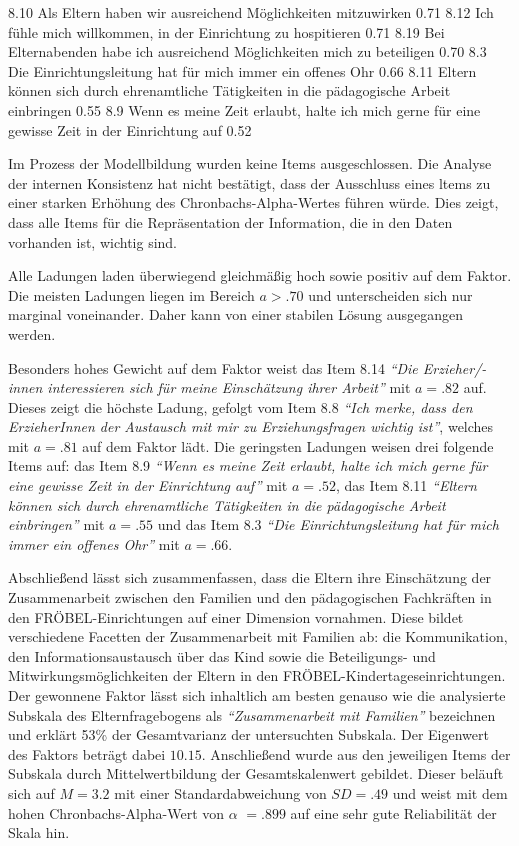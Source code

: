 \documentclass[12pt,a4paper]{article}
\begin{document}
8.10 Als Eltern haben wir ausreichend Möglichkeiten mitzuwirken              0.71
8.12 Ich fühle mich willkommen, in der Einrichtung zu hospitieren              0.71
8.19 Bei Elternabenden habe ich ausreichend Möglichkeiten
        mich zu beteiligen                                                                                   0.70
8.3 Die Einrichtungsleitung hat für mich immer ein offenes Ohr                   0.66         
8.11 Eltern können sich durch ehrenamtliche Tätigkeiten in die
        pädagogische Arbeit einbringen                                                              0.55
8.9 Wenn es meine Zeit erlaubt, halte ich mich gerne für eine
      gewisse Zeit in der Einrichtung auf                                                          0.52

Im Prozess der Modellbildung wurden keine Items ausgeschlossen. Die Analyse der internen Konsistenz hat nicht bestätigt, dass der Ausschluss eines ltems zu einer starken Erhöhung des Chronbachs-Alpha-Wertes führen würde. Dies zeigt, dass alle Items für die Repräsentation der Information, die in den Daten vorhanden ist, wichtig sind.

	Alle Ladungen laden überwiegend gleichmäßig hoch sowie positiv auf dem Faktor. Die meisten Ladungen liegen im Bereich $a >.70$ und unterscheiden sich nur marginal voneinander. Daher kann von einer stabilen Lösung ausgegangen werden.
	
	Besonders hohes Gewicht auf dem Faktor weist das Item 8.14 \textit{"`Die Erzieher/-innen interessieren sich für meine Einschätzung ihrer Arbeit"'} mit $a= .82$ auf. Dieses zeigt die höchste Ladung, gefolgt vom Item 8.8 \textit{"`Ich merke, dass den ErzieherInnen der Austausch mit mir zu Erziehungsfragen wichtig ist"'}, welches mit $a = .81$ auf dem Faktor lädt.
	Die geringsten Ladungen weisen drei folgende Items auf: das Item 8.9 \textit{"`Wenn es meine Zeit erlaubt, halte ich mich gerne für eine gewisse Zeit in der Einrichtung auf"'} mit $a = .52$, das Item 8.11 \textit{"`Eltern können sich durch ehrenamtliche Tätigkeiten in die pädagogische Arbeit einbringen"'} mit $a = .55$ und das Item 8.3 \textit{"`Die Einrichtungsleitung hat für mich immer ein offenes Ohr"'} mit $a = .66$.   
	
	Abschließend lässt sich zusammenfassen, dass die Eltern ihre Einschätzung der Zusammenarbeit zwischen den Familien und den pädagogischen Fachkräften in den FRÖBEL-Einrichtungen auf einer Dimension vornahmen. Diese bildet verschiedene Facetten der Zusammenarbeit mit Familien ab: die Kommunikation, den Informationsaustausch über das Kind sowie die Beteiligungs- und Mitwirkungsmöglichkeiten der Eltern in den FRÖBEL-Kindertageseinrichtungen. Der gewonnene Faktor lässt sich inhaltlich am besten genauso wie die analysierte Subskala des Elternfragebogens als \textit{"`Zusammenarbeit mit Familien"'} bezeichnen und erklärt 53\% der Gesamtvarianz der untersuchten Subskala. Der Eigenwert des Faktors beträgt dabei $10.15$.
	Anschließend wurde aus den jeweiligen Items der Subskala durch Mittelwertbildung der Gesamtskalenwert gebildet. Dieser beläuft sich auf  $M = 3.2$ mit einer Standardabweichung von $SD = .49$ und weist mit dem hohen Chronbachs-Alpha-Wert von $\alpha$ $= .899$ auf eine sehr gute Reliabilität der Skala hin.
	
\end{document}
